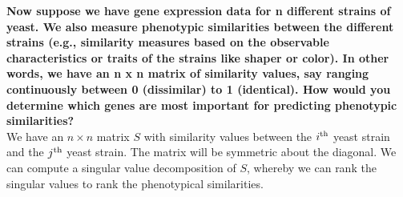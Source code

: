 \documentclass{article}
\begin{document}
\begin{homeworkProblem}
    
    \textbf{Now suppose we have gene expression data for n different strains of
        yeast.  We also measure phenotypic similarities between the different
        strains (e.g., similarity measures based on the observable
        characteristics or traits of the strains like shaper or color).  In
        other words, we have an n x n matrix of similarity values, say ranging
        continuously between 0 (dissimilar) to 1 (identical).  How would you
        determine which genes are most important for predicting phenotypic
    similarities?} \\

    We have an $n \times n$ matrix $S$ with similarity values between the
    $i^{\rm th}$ yeast strain and the $j^{\rm th}$ yeast strain. The matrix
    will be symmetric about the diagonal. We can compute a singular value
    decomposition of $S$, whereby we can rank the singular values to rank the
    phenotypical similarities.
    
    
    \begin{comment}
    We also have an $n \times m$ matrix
    $G$ corresponding to the genotype data for each yeast strain. To determine
    which genes are most important for predicting phenotype similarities, we
    have the following

    \begin{equation}
        G x = S
    \end{equation}

    \noindent where $x$ will be an $m \times n$ matrix where each $i^{\rm th}$
    value corresponds to the gene and the $j^{\rm th}$ yeast strain with the
    given phenotypes.

    \end{comment}



   


\end{homeworkProblem}
\end{document}
